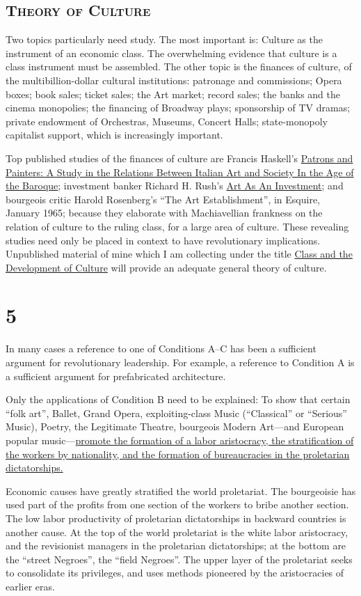 \subsection*{\textsc{Theory of Culture}}
Two topics particularly need study. The most important is: Culture as the instrument of an economic class. The overwhelming evidence that culture is a class instrument must be assembled. The other topic is the finances of culture, of the multibillion-dollar cultural institutions: patronage and commissions; Opera boxes; book sales; ticket sales; the Art market; record sales; the banks and the cinema monopolies; the financing of Broadway plays; sponsorship of TV dramas; private endowment of Orchestras, Museums, Concert Halls; state-monopoly capitalist support, which is increasingly important. 

Top published studies of the finances of culture are Francis Haskell's \uline{Patrons and Painters: A Study in the Relations Between Italian Art and Society In the Age of the Baroque}; investment banker Richard H. Rush's \uline{Art As An Investment}; and bourgeois critic Harold Rosenberg's \enquote{The Art Establishment}, in Esquire, January 1965; because they elaborate with Machiavellian frankness on the relation of culture to the ruling class, for a large area of culture. These revealing studies need only be placed in context to have revolutionary implications. Unpublished material of mine which I am collecting under the title \uline{Class and the Development of Culture} will provide an adequate general theory of culture. 

\section*{5}

In many cases a reference to one of Conditions A--C has been a sufficient argument for revolutionary leadership. For example, a reference to Condition A is a sufficient argument for prefabricated architecture. 

Only the applications of Condition B need to be explained: To show that certain \enquote{folk art}, Ballet, Grand Opera, exploiting-class Music (\enquote{Classical} or \enquote{Serious} Music), Poetry, the Legitimate Theatre, bourgeois Modern Art---and European popular music---\uline{promote the formation of a labor aristocracy, the stratification of the workers by nationality, and the formation of bureaucracies in the proletarian dictatorships.}

Economic causes have greatly stratified the world proletariat. The bourgeoisie has used part of the profits from one section of the workers to bribe another section. The low labor productivity of proletarian dictatorships in backward countries is another cause. At the top of the world proletariat is the white labor aristocracy, and the revisionist managers in the proletarian dictatorships; at the bottom are the \enquote{street Negroes}, the \enquote{field Negroes}. The upper layer of the proletariat seeks to consolidate its privileges, and uses methods pioneered by the aristocracies of earlier eras. 

